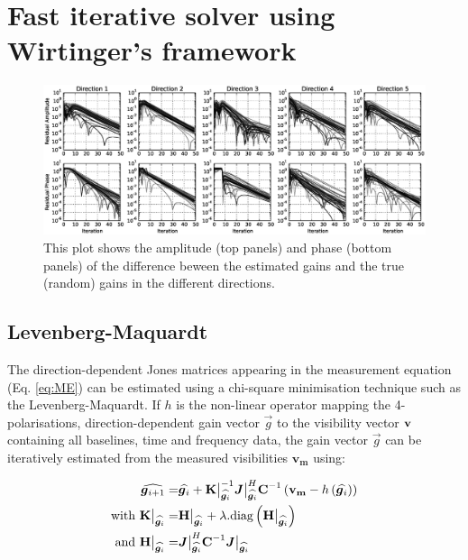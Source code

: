 \section{Fast iterative solver using Wirtinger's framework}
\label{sec:Solver}

\begin{figure}[t!]
\begin{center}
\includegraphics[width=\textwidth]{ConvergenceLog.eps}
\caption{\label{fig:Convergence} This plot shows the amplitude (top
  panels) and
  phase (bottom panels) of the difference beween
  the estimated gains and the true (random) gains in the different directions.}
\end{center}
\end{figure}

\subsection{Levenberg-Maquardt}

The direction-dependent Jones matrices appearing in the measurement
equation (Eq. \ref{eq:ME}) can be estimated using a chi-square
minimisation technique such as the Levenberg-Maquardt. If $h$ is the non-linear operator mapping the
4-polarisations, direction-dependent gain vector $\vec{g}$ to the
visibility vector $\textbf{v}$ containing all baselines, time and frequency
data, the gain vector $\vec{g}$ can be iteratively estimated from the
measured visibilities $\mathbf{v_m}$ using:

\def\SimpleJacobAtXi{\bm{J}\big|_{\widehat{\g_{i}}}}
\def\HAtXi{\H\big|_{\widehat{\g_{i}}}}
\def\KAtXi{\textbf{K}\big|_{\widehat{\g_{i}}}}
\begin{alignat}{2}
\label{eq:LM}
\widehat{\vec{g}_{i+1}}=&\widehat{\vec{g}_{i}}+\KAtXi^{-1}\SimpleJacobAtXi^H\textbf{C}^{-1}\left(\mathbf{v_m}-h\left(\widehat{\vec{g}_{i}}\right)\right)\\
\text{with }\KAtXi=&\HAtXi+\lambda.\text{diag} \left(\HAtXi\right)\\
\text{and }\HAtXi=&\SimpleJacobAtXi^H\textbf{C}^{-1}\SimpleJacobAtXi
\end{alignat}

